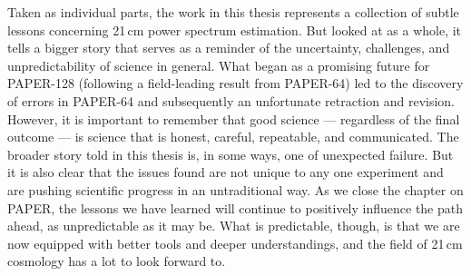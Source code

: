 Taken as individual parts, the work in this thesis represents a collection of subtle lessons concerning 21\,cm power spectrum estimation. But looked at as a whole, it tells a bigger story that serves as a reminder of the uncertainty, challenges, and unpredictability of science in general. What began as a promising future for PAPER-128 (following a field-leading result from PAPER-64) led to the discovery of errors in PAPER-64 and subsequently an unfortunate retraction and revision. However, it is important to remember that good science --- regardless of the final outcome --- is science that is honest, careful, repeatable, and communicated. The broader story told in this thesis is, in some ways, one of unexpected failure. But it is also clear that the issues found are not unique to any one experiment and are pushing scientific progress in an untraditional way. As we close the chapter on PAPER, the lessons we have learned will continue to positively influence the path ahead, as unpredictable as it may be. What is predictable, though, is that we are now equipped with better tools and deeper understandings, and the field of 21\,cm cosmology has a lot to look forward to. 




